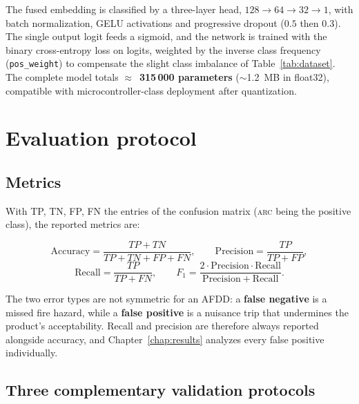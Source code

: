The fused embedding is classified by a three-layer head, $128 \to 64 \to 32 \to 1$, with batch normalization, GELU activations and progressive dropout ($0.5$ then $0.3$). The single output logit feeds a sigmoid, and the network is trained with the binary cross-entropy loss on logits, weighted by the inverse class frequency (\texttt{pos\_weight}) to compensate the slight class imbalance of Table~\ref{tab:dataset}. The complete model totals $\approx$~\textbf{315\,000 parameters} ($\sim$1.2~MB in float32), compatible with microcontroller-class deployment after quantization.

\section{Evaluation protocol}
\label{sec:protocol}

\subsection{Metrics}

With TP, TN, FP, FN the entries of the confusion matrix (\textsc{arc} being the positive class), the reported metrics are:

\begin{equation}
\mathrm{Accuracy} = \frac{TP + TN}{TP + TN + FP + FN}, \qquad
\mathrm{Precision} = \frac{TP}{TP + FP},
\end{equation}
\begin{equation}
\mathrm{Recall} = \frac{TP}{TP + FN}, \qquad
F_1 = \frac{2 \cdot \mathrm{Precision} \cdot \mathrm{Recall}}{\mathrm{Precision} + \mathrm{Recall}}.
\end{equation}

The two error types are not symmetric for an AFDD: a \textbf{false negative} is a missed fire hazard, while a \textbf{false positive} is a nuisance trip that undermines the product's acceptability. Recall and precision are therefore always reported alongside accuracy, and Chapter~\ref{chap:results} analyzes every false positive individually.

\subsection{Three complementary validation protocols}

